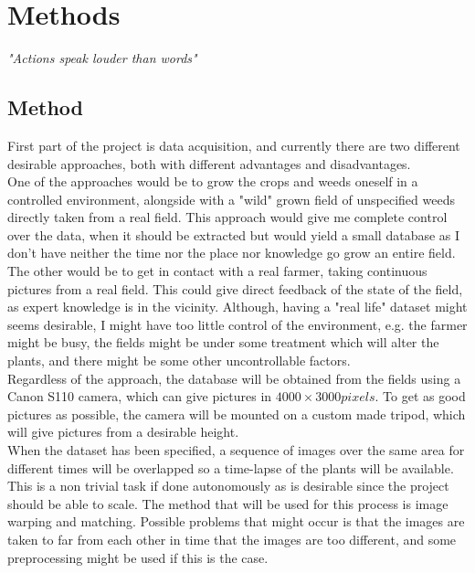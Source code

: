 \chapter{Methods}
\begin{center}
\vspace{-6ex}
\textit{"Actions speak louder than words"}
\vspace{6ex}
\end{center}




\section{Method}

First part of the project is data acquisition, and currently there are two different desirable approaches, both with different advantages and disadvantages.\\

One of the approaches would be to grow the crops and weeds oneself in a controlled environment, alongside with a "wild" grown field of unspecified weeds directly taken from a real field. This approach would give me complete control over the data, when it should be extracted but would yield a small database as I don't have neither the time nor the place nor knowledge go grow an entire field.\\

The other would be to get in contact with a real farmer, taking continuous pictures from a real field. This could give direct feedback of the state of the field, as expert knowledge is in the vicinity. Although, having a "real life" dataset might seems desirable, I might have too little control of the environment, e.g. the farmer might be busy, the fields might be under some treatment which will alter the plants, and there might be some other uncontrollable factors.\\

Regardless of the approach, the database will be obtained from the fields using a Canon S110 camera, which can give pictures in $4000 \times 3000 pixels$. To get as good pictures as possible, the camera will be mounted on a custom made tripod, which will give pictures from a desirable height.\\

When the dataset has been specified, a sequence of images over the same area for different times will be overlapped so a time-lapse of the plants will be available. This is a non trivial task if done autonomously as is desirable since the project should be able to scale. The method that will be used for this process is image warping and matching. Possible problems that might occur is that the images are taken to far from each other in time that the images are too different, and some preprocessing might be used if this is the case.\\

